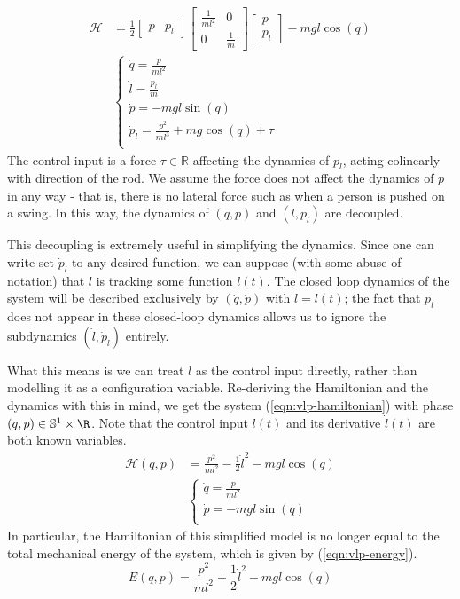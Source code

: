 \begin{align}\label{eqn:vlp-hamiltonian-with-pl}
   \mathcal{H} &= \frac{1}{2} \begin{bmatrix} p & p_l \end{bmatrix}
      \begin{bmatrix}
         \frac{1}{ml^2}  & 0 \\
         0 & \frac{1}{m}
      \end{bmatrix} \begin{bmatrix} p \\ p_l \end{bmatrix} - mgl\cos(q) \\
     &\begin{cases}
        \dot{q} = \frac{p}{ml^2} \\
        \dot{l} = \frac{p_l}{m} \\
        \dot{p} = -mgl\sin(q) \\
        \dot{p}_l = \frac{p^2}{ml^3} + mg\cos(q) + \tau \\
   \end{cases} \nonumber
\end{align}
The control input is a force \(\tau \in \mathbb{R}\) affecting the dynamics of
\(p_l\), acting colinearly with direction of the rod.
We assume the force does not affect the dynamics of \(p\) in any way -
that is, there is no lateral force such as when a person is pushed on a swing.
In this way, the dynamics of \((q,p)\) and \((l,p_l)\) are decoupled. 

This decoupling is extremely useful in simplifying the dynamics. Since one can
write set \(\dot{p}_l\) to any desired function, we can suppose (with some abuse
of notation) that \(l\) is tracking some function \(l(t)\). 
The closed loop dynamics of the system will be described exclusively by
\((\dot{q},\dot{p})\) with \(l = l(t)\); 
the fact that \(p_l\) does not appear in these closed-loop dynamics allows us to
ignore the subdynamics \((\dot{l},\dot{p}_l)\) entirely.

What this means is we can treat \(l\) as the control input directly, rather than
modelling it as a configuration variable. Re-deriving the Hamiltonian and the
dynamics with this in mind, we get the system 
(\ref{eqn:vlp-hamiltonian}) with phase \((q,p) \in \mathbb{S}^1 \times \R\). 
Note that the control input \(l(t)\) and its derivative \(\dot{l}(t)\) are both
known variables.
\begin{align}\label{eqn:vlp-hamiltonian}
   \mathcal{H}(q,p) &= \frac{p^2}{ml^2} - \frac{1}{2}\dot{l}^2 - mgl\cos(q) \\
     &\begin{cases}
        \dot{q} = \frac{p}{ml^2} \\
        \dot{p} = -mgl\sin(q) \\
      \end{cases}\nonumber
\end{align}
In particular, the Hamiltonian of this simplified model is no longer equal to
the total mechanical energy of the system, which is given by
(\ref{eqn:vlp-energy}).
\begin{equation}\label{eqn:vlp-energy}
   E(q,p) = \frac{p^2}{ml^2} + \frac{1}{2}\dot{l}^2 - mgl\cos(q)
\end{equation}

